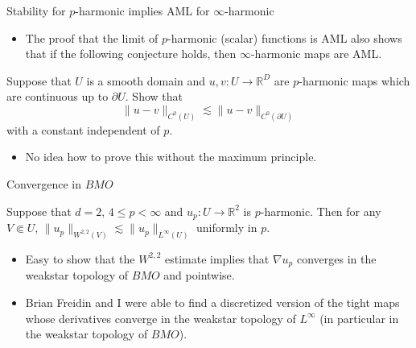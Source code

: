 \documentclass[10pt]{beamer}
\newcommand{\RR}{\mathbb{R}}
\begin{document}
\begin{frame}{Stability for $p$-harmonic implies AML for $\infty$-harmonic}
\begin{itemize}
\item The proof that the limit of $p$-harmonic (scalar) functions is AML also shows that if the following conjecture holds, then $\infty$-harmonic maps are AML. \pause
\end{itemize}

\begin{problem}
Suppose that $U$ is a smooth domain and $u, v: U \to \RR^D$ are $p$-harmonic maps which are continuous up to $\partial U$.
Show that
$$\|u - v\|_{C^0(U)} \lesssim \|u - v\|_{C^0(\partial U)}$$
with a constant independent of $p$. \pause 
\end{problem}

\begin{itemize}
\item No idea how to prove this without the maximum principle.
\end{itemize}
\end{frame}

\begin{frame}{Convergence in $BMO$}
\begin{theorem} 
Suppose that $d = 2$, $4 \leq p < \infty$ and $u_p: U \to \RR^2$ is $p$-harmonic.
Then for any $V \Subset U$, $\|u_p\|_{W^{2, 2}(V)} \lesssim \|u_p\|_{L^\infty(U)}$ uniformly in $p$. \pause
\end{theorem}

\begin{itemize}
\item Easy to show that the $W^{2, 2}$ estimate implies that $\nabla u_p$ converges in the weakstar topology of $BMO$ and pointwise. \pause
\item Brian Freidin and I were able to find a discretized version of the tight maps whose derivatives converge in the weakstar topology of $L^\infty$ (in particular in the weakstar topology of $BMO$).
\end{itemize}

\end{frame}
\end{document}
